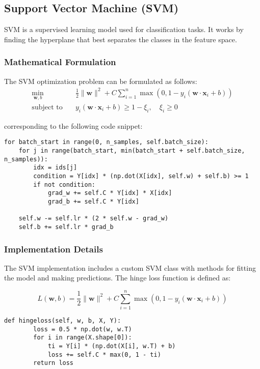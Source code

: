 \documentclass[12pt]{article}
\begin{document}
\subsection{Support Vector Machine (SVM)}
SVM is a supervised learning model used for classification tasks. It works by finding the hyperplane that best separates the classes in the feature space.

\subsubsection{Mathematical Formulation}
The SVM optimization problem can be formulated as follows:
\begin{align}
\min_{\mathbf{w}, b} & \quad \frac{1}{2} \|\mathbf{w}\|^2 + C \sum_{i=1}^{n} \max(0, 1 - y_i (\mathbf{w} \cdot \mathbf{x}_i + b)) \\
\text{subject to} & \quad y_i (\mathbf{w} \cdot \mathbf{x}_i + b) \geq 1 - \xi_i, \quad \xi_i \geq 0
\end{align}

corresponding to the following code snippet:

\begin{verbatim}
for batch_start in range(0, n_samples, self.batch_size):
    for j in range(batch_start, min(batch_start + self.batch_size, n_samples)):
        idx = ids[j]
        condition = Y[idx] * (np.dot(X[idx], self.w) + self.b) >= 1
        if not condition:
            grad_w += self.C * Y[idx] * X[idx]
            grad_b += self.C * Y[idx]

    self.w -= self.lr * (2 * self.w - grad_w)
    self.b += self.lr * grad_b
\end{verbatim}

\subsubsection{Implementation Details}
The SVM implementation includes a custom SVM class with methods for fitting the model and making predictions. The hinge loss function is defined as:

\begin{equation}
L(\mathbf{w}, b) = \frac{1}{2} \|\mathbf{w}\|^2 + C \sum_{i=1}^{n} \max(0, 1 - y_i (\mathbf{w} \cdot \mathbf{x}_i + b))
\end{equation}

\begin{verbatim}
def hingeloss(self, w, b, X, Y):
        loss = 0.5 * np.dot(w, w.T)
        for i in range(X.shape[0]):
            ti = Y[i] * (np.dot(X[i], w.T) + b)
            loss += self.C * max(0, 1 - ti)
        return loss
\end{verbatim}
\end{document}
